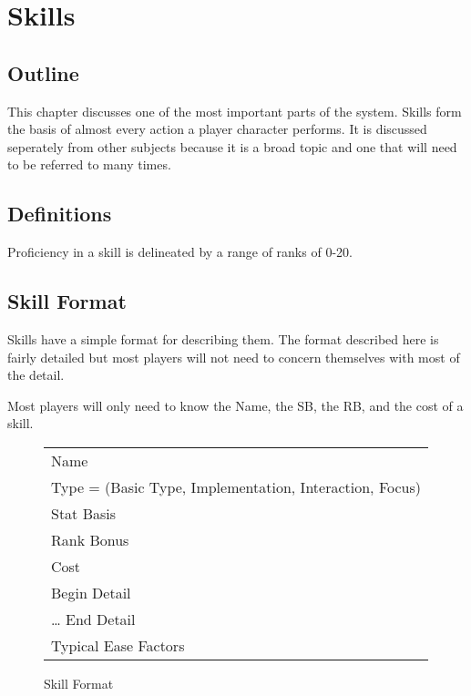 \chapter{Skills}

\section{Outline}

This chapter discusses one of the most important parts of the system. 
Skills form the basis of almost every action a player character 
performs. It is discussed seperately from other subjects
because it is a broad topic and one that will need to be referred to 
many times.

\section{Definitions}

Proficiency in a skill is delineated by a range of ranks of 0-20. 

\section{Skill Format}

Skills have a simple format for describing them. The format described 
here is fairly detailed but most players will not need to concern 
themselves with most of the detail. 

Most players will only need to know the Name, the SB, the RB, and the cost 
of a skill.

\begin{figure}[h]
\centering
\caption{Skill Format}
	\begin{tabular}{|l|} \hline
	Name   \\
	Type = (Basic Type, Implementation, Interaction, Focus) \\
	Stat Basis \\
	Rank Bonus \\
	Cost \\
	Begin Detail \\
	\dots
	End Detail \\
	Typical Ease Factors \\ \hline
    \end{tabular}
\end{figure}

